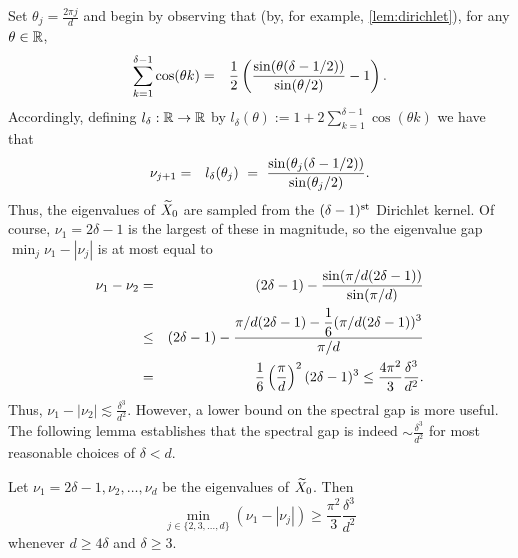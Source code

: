 Set $\theta_j = \frac{2 \pi j}{d}$ and begin by observing that (by, for example, \cref{lem:dirichlet}), for any $\theta \in \mathbb{R}$,
\begin{eqnarray*}
  \sum_{k = 1}^{\delta - 1}\cos(\theta k) %
  & = & \bigfrac{1}{2}\left(\bigfrac{\sin(\theta(\delta - 1/2))}{\sin(\theta / 2)} - 1\right).
\end{eqnarray*}
Accordingly, defining $l_\delta : \mathbb{R} \to \mathbb{R}$ by $l_\delta(\theta) := 1 + 2\sum_{k=1}^{\delta - 1} \cos(\theta k)$ we have that
\begin{eqnarray}
  \nu_{j+1} %
  & = & l_\delta(\theta_j) ~=~ \bigfrac{\sin(\theta_j(\delta - 1/2))}{\sin(\theta_j / 2)}. \label{equ:EigenFormula}
\end{eqnarray}
Thus, the eigenvalues of $\widetilde{X}_0$ are sampled from the $(\delta-1)^{\rm st}$ Dirichlet kernel.  
Of course, $\nu_1 = 2\delta - 1$ is the largest of these in magnitude, so the eigenvalue gap $\min_j \nu_1 - |\nu_j|$ is at most equal to
\begin{eqnarray*}
  \nu_1 - \nu_2 & = & (2\delta -  1) - \frac{\displaystyle \sin(\pi / d (2\delta - 1))}{\displaystyle \sin(\pi / d)} \\
  & \le & (2 \delta - 1) - \frac{\displaystyle \pi / d(2 \delta - 1) - \frac{1}{6}(\pi / d (2 \delta - 1))^3}{\displaystyle \pi / d} \\
  & = & \frac{1}{6}\left(\frac{\pi}{d}\right)^2(2 \delta - 1)^3 \le \frac{4\pi^2}{3} \frac{\delta^3}{d^2} \label{equ:gap12}.
\end{eqnarray*}
Thus, $\nu_1 - |\nu_2 | \lesssim \frac{\delta^3}{d^2}$.  However, a lower bound on the spectral gap is more useful.  The following lemma establishes that the spectral gap is indeed $\sim \frac{\delta^3}{d^2}$ for most reasonable choices of $\delta < d$.

\begin{lemma}
Let $\nu_1 = 2 \delta -1, \nu_2, \dots, \nu_d$ be the eigenvalues of $\widetilde{X}_0$.  Then
$$\min_{j \in \{2, 3, \dots, d \} } (\nu_1 - |\nu_j| ) \geq \dfrac{\pi^2}{3} \frac{\delta^3}{d^2}$$
whenever $d \geq 4\delta$ and $\delta \geq 3$.
\label{lem:EigGap}
\end{lemma}

